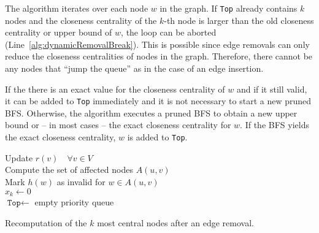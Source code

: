 The algorithm iterates over each node $w$ in the graph. If \texttt{Top} already contains $k$ nodes and the closeness centrality of the $k$-th node is larger than the old closeness centrality or upper bound of $w$, the loop can be aborted (Line~\ref{alg:dynamicRemovalBreak}). This is possible since edge removals can only reduce the closeness centralities of nodes in the graph. Therefore, there cannot be any nodes that ``jump the queue'' as in the case of an edge insertion.

If the there is an exact value for the closeness centrality of $w$ and if it still valid, it can be added to \texttt{Top} immediately and it is not necessary to start a new pruned BFS. Otherwise, the algorithm executes a pruned BFS to obtain a new upper bound or – in most cases – the exact closeness centrality for $w$. If the BFS yields the exact closeness centrality, $w$ is added to \texttt{Top}. 
\begin{algorithm2e}[h!]
 \label{alg:borassiDynamicRemoval}
 Update $r(v)\quad \forall v \in V$ \label{alg:dynamicRemovalPreprocessing}\\
 Compute the set of affected nodes $A(u, v)$ \\
 Mark $h(w)$ as invalid for $w \in A(u, v)$ \\
 
 $x_k \gets 0$ \\ 
 $\texttt{Top} \gets $ empty priority queue \label{alg:dynamicRemovalTop} \\
 
 \caption{Recomputation of the $k$ most central nodes after an edge removal.}
\end{algorithm2e}

